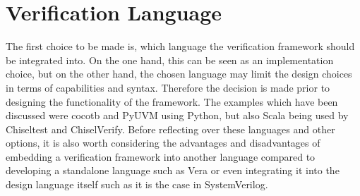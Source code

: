 \section{Verification Language} %

The first choice to be made is, which language the verification framework should be integrated into. On the one hand,
this can be seen as an implementation choice, but on the other hand, the chosen language may limit the design choices
in terms of capabilities and syntax. Therefore the decision is made prior to designing the functionality of the
framework. The examples
which have been discussed were cocotb and PyUVM using Python, but also Scala being used by Chiseltest and
ChiselVerify. Before reflecting over these languages and other options, it is also worth considering the advantages
and disadvantages of embedding a verification framework into another language compared to developing a standalone
language such as Vera or even integrating it into the design language itself such as it is the case in SystemVerilog.

